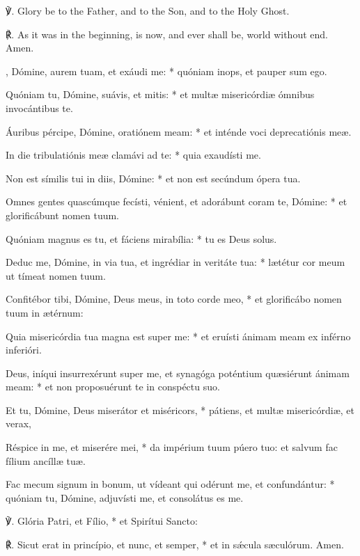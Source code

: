 {℣. Glory be to the Father, and to the Son, and to the Holy Ghost.\par
℟. As it was in the beginning, is now, and ever shall be, world without end. Amen.}{, Dómine, aurem tuam, et exáudi me: * quóniam inops, et pauper sum ego.\par
{}
Quóniam tu, Dómine, suávis, et mitis: * et mult{\ae} misericórdi{\ae} ómnibus invocántibus te.\par
Áuribus pércipe, Dómine, oratiónem meam: * et inténde voci deprecatiónis me{\ae}.\par
In die tribulatiónis me{\ae} clamávi ad te: * quia exaudísti me.\par
Non est símilis tui in diis, Dómine: * et non est secúndum ópera tua.\par
Omnes gentes quascúmque fecísti, vénient, et adorábunt coram te, Dómine: * et glorificábunt nomen tuum.\par
Quóniam magnus es tu, et fáciens mirabília: * tu es Deus solus.\par
Deduc me, Dómine, in via tua, et ingrédiar in veritáte tua: * l{\ae}tétur cor meum ut tímeat nomen tuum.\par
Confitébor tibi, Dómine, Deus meus, in toto corde meo, * et glorificábo nomen tuum in {\ae}térnum:\par
Quia misericórdia tua magna est super me: * et eruísti ánimam meam ex inférno inferióri.\par
Deus, iníqui insurrexérunt super me, et synagóga poténtium qu{\ae}siérunt ánimam meam: * et non proposuérunt te in conspéctu suo.\par
Et tu, Dómine, Deus miserátor et miséricors, * pátiens, et mult{\ae} misericórdi{\ae}, et verax,\par
Réspice in me, et miserére mei, * da impérium tuum púero tuo: et salvum fac fílium ancíll{\ae} tu{\ae}.\par
Fac mecum signum in bonum, ut vídeant qui odérunt me, et confundántur: * quóniam tu, Dómine, adjuvísti me, et consolátus es me.\par
℣. Glória Patri, et Fílio, * et Spirítui Sancto:\par
℟. Sicut erat in princípio, et nunc, et semper, * et in sǽcula s{\ae}culórum. Amen.}
